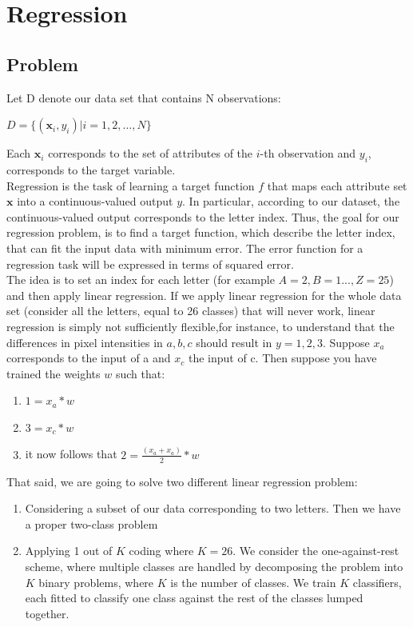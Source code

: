 \chapter*{Regression}
\setcounter{chapter}{1}
\section{Problem}
\setcounter{section}{1}
Let D denote our data set that contains N observations:
\begin{center}
$D = \{( \textbf{x}_i ,y_i ) | i = 1, 2, \dots, N\}$
\end{center}
Each $\textbf{x}_i $ corresponds to the set of attributes of the $i$-th observation and $y_i$, corresponds to the target variable. \\

Regression is the task of learning a target function $f$ that maps each attribute set $\textbf{x}$ into a continuous-valued output $y$. In particular, according to our dataset, the continuous-valued output corresponds to the letter index. 
Thus, the goal for our  regression problem, is to find a target function, which describe the letter index, that can fit the input data with minimum error. The error function for a regression task will be expressed in terms of squared error.\\

The idea is to set an index for each letter (for example $A=2, B=1 ... , Z = 25$) and then apply linear regression. 
If we apply linear regression for the whole data set (consider all the letters, equal to 26 classes) that will never work, linear regression is simply not sufficiently flexible,for instance, to understand that the differences in pixel intensities in $a, b, c$ should result in $y = 1, 2, 3$. Suppose $x_a$ corresponds to the input of a and $x_c$ the input of c. Then suppose you have trained the weights $w$ such that:
\begin{enumerate}
\item []$1 = x_a * w$
\item []$3 = x_c * w$
\item []it now follows that $2 = \frac{(x_a + x_a)}{2}* w$\\
\end{enumerate}

That said, we are going to solve two different linear regression problem:
\begin{enumerate}
\item Considering a subset of our data corresponding to two letters. Then we have a proper two-class problem
\item Applying 1 out of $K$ coding where $K=26$. We consider the one-against-rest scheme, where multiple classes are handled by decomposing the problem into $K$ binary problems, where $K$ is the number of classes. We train $K$ classifiers, each fitted to classify one class against the rest of the classes lumped together.
\end {enumerate}

